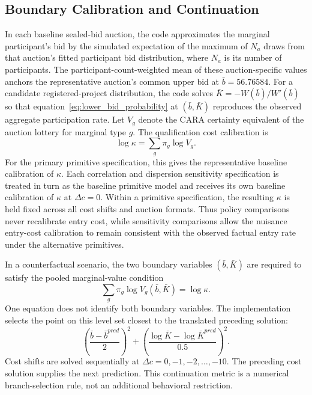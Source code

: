 \documentclass[10pt]{article}
\begin{document}
\subsection{Boundary Calibration and Continuation}

In each baseline sealed-bid auction, the code approximates the marginal
participant's bid by the simulated expectation of the maximum of $N_a$ draws
from that auction's fitted participant bid distribution, where $N_a$ is its
number of participants.  The participant-count-weighted mean of these
auction-specific values anchors the representative auction's common upper bid
at $\bar b=56.76584$.  For a candidate registered-project distribution, the
code solves $\bar K=-W(\bar b)/W'(\bar b)$ so that
equation~\eqref{eq:lower_bid_probability} at $(\bar b,\bar K)$ reproduces the
observed aggregate participation rate.  Let $V_g$ denote the CARA certainty
equivalent of the auction lottery for marginal type $g$.  The qualification
cost calibration is
\begin{equation}
\log\kappa=\sum_g\pi_g\log V_g.
\label{eq:kappa}
\end{equation}
For the primary primitive specification, this gives the representative
baseline calibration of $\kappa$.  Each correlation and dispersion sensitivity
specification is treated in turn as the baseline primitive model and receives
its own baseline calibration of $\kappa$ at $\Delta c=0$.
Within a primitive specification, the resulting $\kappa$ is held fixed across
all cost shifts and auction formats.  Thus policy comparisons never
recalibrate entry cost, while sensitivity comparisons allow the nuisance
entry-cost calibration to remain consistent with the observed factual entry
rate under the alternative primitives.

In a counterfactual scenario, the two boundary variables $(\bar b,\bar K)$
are required to satisfy the pooled marginal-value condition
\begin{equation}
\sum_g\pi_g\log V_g(\bar b,\bar K)=\log\kappa.
\label{eq:pooled_entry}
\end{equation}
One equation does not identify both boundary variables.  The implementation
selects the point on this level set closest to the translated preceding
solution:
\begin{equation}
\left(\frac{\bar b-\bar b^{pred}}{2}\right)^2
+\left(\frac{\log\bar K-\log\bar K^{pred}}{0.5}\right)^2.
\label{eq:continuation_metric}
\end{equation}
Cost shifts are solved sequentially at
$\Delta c=0,-1,-2,\ldots,-10$.  The preceding cost solution supplies the next
prediction.  This continuation metric is a numerical branch-selection rule,
not an additional behavioral restriction.
\end{document}
